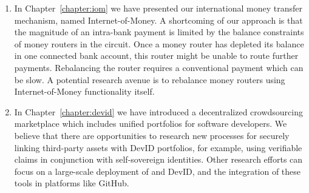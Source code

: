\begin{enumerate}
	\item In Chapter~\ref{chapter:iom} we have presented our international money transfer mechanism, named Internet-of-Money.
	A shortcoming of our approach is that the magnitude of an intra-bank payment is limited by the balance constraints of money routers in the circuit.
	Once a money router has depleted its balance in one connected bank account, this router might be unable to route further payments.
	Rebalancing the router requires a conventional payment which can be slow.
	A potential research avenue is to rebalance money routers using Internet-of-Money functionality itself.
	
	\item In Chapter~\ref{chapter:devid} we have introduced a decentralized crowdsourcing marketplace which includes unified portfolios for software developers.
	We believe that there are opportunities to research new processes for securely linking third-party assets with DevID portfolios, for example, using verifiable claims in conjunction with self-sovereign identities.
	Other research efforts can focus on a large-scale deployment of \Dappcoder{} and DevID, and the integration of these tools in platforms like GitHub.
\end{enumerate}